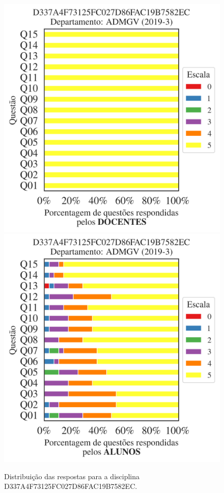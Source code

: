 \documentclass[a4paper,10pt]{article}
\begin{document}
\begin{figure}[h]
\centering
\includegraphics[width=0.485\linewidth]{analise_disciplina_departamento_ADMGV_D337A4F73125FC027D86FAC19B7582EC_docentes.png}
\includegraphics[width=0.485\linewidth]{analise_disciplina_departamento_ADMGV_D337A4F73125FC027D86FAC19B7582EC_alunos.png}
\caption{\label{fig:analise_geral_departamento}                Distribuição das respostas para a disciplina D337A4F73125FC027D86FAC19B7582EC. }
\end{figure}
\end{document}
